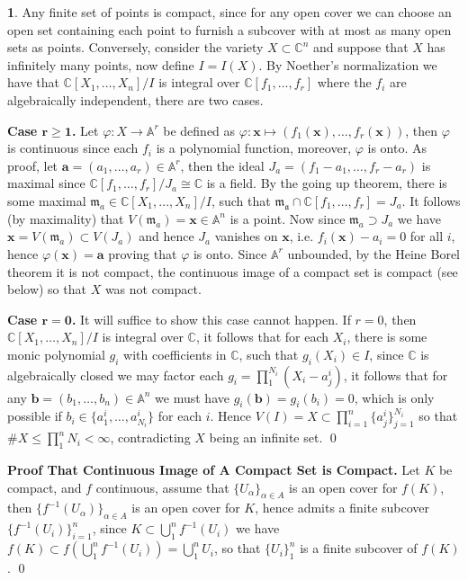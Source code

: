 \documentclass[11pt]{article}
\theoremstyle{definition}
\newtheorem{pb}{}
\newcommand{\set}[1]{\{#1\}}
\begin{document}
    \begin{pb}
        Any finite set of points is compact, since for any open cover we can choose an open set containing each point to furnish a subcover with at most as many open sets as points. Conversely, consider the variety \(X \subset \mathbb{C}^n\) and suppose that \(X\) has infinitely many points, now define \(I = I(X)\). By Noether's normalization we have that \(\mathbb{C}[X_1,\hdots,X_n]/I\) is integral over \(\mathbb{C}[f_1,\hdots,f_r]\) where the \(f_i\) are algebraically independent, there are two cases.

        \textbf{Case \(\mathbf{r \geq 1}\).} Let \(\varphi: X \to \mathbb{A}^r\) be defined as \(\varphi: \mathbf{x} \mapsto (f_1(\mathbf{x}),\hdots,f_r(\mathbf{x}))\), then \(\varphi\) is continuous since each \(f_i\) is a polynomial function, moreover, \(\varphi\) is onto. As proof, let \(\mathbf{a} = (a_1,\hdots,a_r) \in \mathbb{A}^r\), then the ideal \(J_a = (f_1-a_1,\hdots,f_r-a_r)\) is maximal since \(\mathbb{C}[f_1,\hdots,f_r]/J_a \cong \mathbb{C}\) is a field. By the going up theorem, there is some maximal \(\mathfrak{m}_a \in \mathbb{C}[X_1,\hdots,X_n]/I\), such that \(\mathfrak{m_a}\cap \mathbb{C}[f_1,\hdots,f_r] = J_a\). It follows (by maximality) that \(V(\mathfrak{m}_a) = \mathbf{x} \in \mathbb{A}^n\) is a point. Now since \(\mathfrak{m}_a \supset J_a\) we have \(\mathbf{x} = V(\mathfrak{m}_a) \subset V(J_a)\) and hence \(J_a\) vanishes on \(\mathbf{x}\), i.e. \(f_i(\mathbf{x}) - a_i = 0\) for all \(i\), hence \(\varphi(\mathbf{x}) = \mathbf{a}\) proving that \(\varphi\) is onto. Since \(\mathbb{A}^r\) unbounded, by the Heine Borel theorem it is not compact, the continuous image of a compact set is compact (see below) so that \(X\) was not compact.

        \textbf{Case \(\mathbf{r = 0}\).} It will suffice to show this case cannot happen. If \(r = 0\), then \(\mathbb{C}[X_1,\hdots,X_n]/I\) is integral over \(\mathbb{C}\), it follows that for each \(X_i\), there is some monic polynomial \(g_i\) with coefficients in \(\mathbb{C}\), such that \(g_i(X_i) \in I\), since \(\mathbb{C}\) is algebraically closed we may factor each \(g_i = \prod_{1}^{N_i}(X_i - a^i_j)\), it follows that for any \(\mathbf{b} = (b_1,\hdots,b_n) \in \mathbb{A}^n\) we must have \(g_i(\mathbf{b}) = g_i(b_i) = 0\), which is only possible if \(b_i \in \set{a^i_1,\hdots,a^i_{N_i}}\) for each \(i\).
        Hence \(V(I) = X \subset \prod_{i=1}^n \set{a^i_j}_{j=1}^{N_i}\) so that \(\# X \leq \prod_1^n N_i < \infty\), contradicting \(X\) being an infinite set. \qed

        \textbf{Proof That Continuous Image of A Compact Set is Compact.} Let \(K\) be compact, and \(f\) continuous, assume that \(\set{U_\alpha}_{\alpha\in A}\) is an open cover for \(f(K)\), then \(\set{f^{-1}(U_\alpha)}_{\alpha \in A}\) is an open cover for \(K\), hence admits a finite subcover \(\set{f^{-1}(U_i)}_{i=1}^n\), since \(K \subset \bigcup_1^n f^{-1}(U_i)\) we have \(f(K) \subset f(\bigcup_1^n f^{-1}(U_i)) = \bigcup_1^n U_i\), so that \(\set{U_i}_1^n\) is a finite subcover of \(f(K)\). \qed
    \end{pb}
\end{document}
